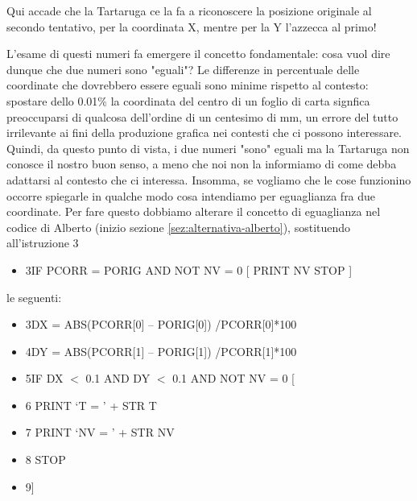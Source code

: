 Qui accade che la Tartaruga ce la fa a riconoscere la posizione originale al 
secondo tentativo, per la coordinata X, mentre per la Y l'azzecca al primo! 

L'esame di questi numeri fa emergere il concetto fondamentale: cosa vuol dire
dunque che due numeri sono "eguali"? Le differenze in percentuale delle
coordinate che dovrebbero essere eguali sono minime rispetto al contesto:
spostare dello 0.01\% la coordinata del centro di un foglio di carta signfica
preoccuparsi di qualcosa dell'ordine di un centesimo di mm, un errore del tutto
irrilevante ai fini della produzione grafica nei contesti che ci possono
interessare. Quindi, da questo punto di vista, i due numeri "sono" eguali ma la
Tartaruga non conosce il nostro buon senso, a meno che noi non la informiamo di
come debba adattarsi al contesto che ci interessa. Insomma, se vogliamo che le
cose funzionino occorre spiegarle in qualche modo cosa intendiamo per
eguaglianza fra due coordinate. Per fare questo dobbiamo alterare il concetto
di eguaglianza nel codice di Alberto (inizio sezione \ref{sez:alternativa-alberto}), 
sostituendo all'istruzione 3

\vskip 1cm

\begin{minipage}{1.0\textwidth}
\begin{itemize}[itemsep=-3pt,parsep=2pt]
\item[] 3\hspace{8pt}\hspace{8pt}IF PCORR = PORIG  AND NOT NV = 0 [ PRINT NV STOP ]   
\end{itemize}          	          
\end{minipage}

\vskip 1cm

le seguenti:

\vskip 1cm

\begin{minipage}{1.0\textwidth}
\begin{itemize}[itemsep=-3pt,parsep=2pt]
\item[] 3\hspace{8pt}DX = ABS(PCORR[0] – PORIG[0]) /PCORR[0]*100
\item[] 4\hspace{8pt}DY = ABS(PCORR[1] – PORIG[1]) /PCORR[1]*100
\item[] 5\hspace{8pt}IF DX $<$ 0.1 AND DY $<$ 0.1  AND NOT NV = 0 [
\item[] 6\hspace{8pt}\hspace{8pt}    PRINT ‘T = ’ + STR T
\item[] 7\hspace{8pt}\hspace{8pt}    PRINT ‘NV = ’ + STR NV  
\item[] 8\hspace{8pt}\hspace{8pt}    STOP
\item[] 9\hspace{8pt}] 
\end{itemize}          	          
\end{minipage}

